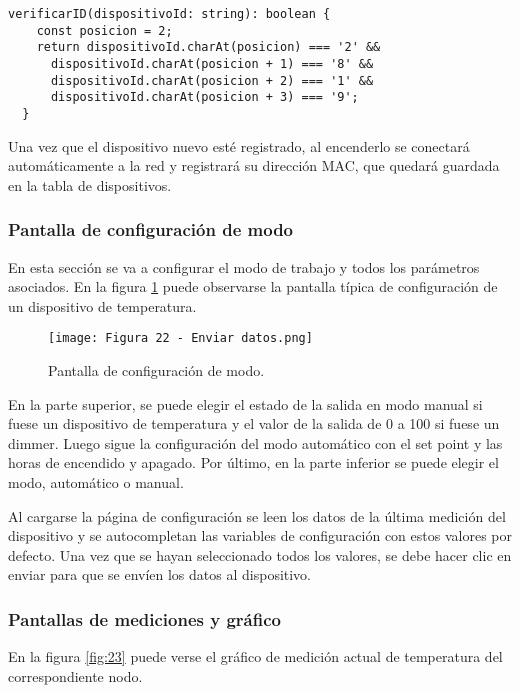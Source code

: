 \begin{lstlisting}[caption={Verificación de ID.}, label={lst:Verificación de ID}]
verificarID(dispositivoId: string): boolean {
    const posicion = 2;
    return dispositivoId.charAt(posicion) === '2' &&
      dispositivoId.charAt(posicion + 1) === '8' &&
      dispositivoId.charAt(posicion + 2) === '1' &&
      dispositivoId.charAt(posicion + 3) === '9';
  }
\end{lstlisting}

Una vez que el dispositivo nuevo esté registrado, al encenderlo se conectará automáticamente a la red y registrará su dirección MAC, que quedará guardada en la tabla de dispositivos.

\subsubsection{Pantalla de configuración de modo}

En esta sección se va a configurar el modo de trabajo y todos los parámetros asociados. En la figura \ref{fig:22} puede observarse la pantalla típica de configuración de un dispositivo de temperatura.

\begin{figure}[h]
\centering
\texttt{[image: Figura 22 - Enviar datos.png]}
\caption[Pantalla de configuración de modo]{Pantalla de configuración de modo.}
\label{fig:22}
\end{figure}

En la parte superior, se puede elegir el estado de la salida en modo manual si fuese un dispositivo de temperatura y el valor de la salida de 0 a 100 si fuese un dimmer. Luego sigue la configuración del modo automático con el set point y las horas de encendido y apagado. Por último, en la parte inferior se puede elegir el modo, automático o manual.

Al cargarse la página de configuración se leen los datos de la última medición del dispositivo y se autocompletan las variables de configuración con estos valores por defecto. Una vez que se hayan seleccionado todos los valores, se debe hacer clic en enviar para que se envíen los datos al dispositivo.

\subsubsection{Pantallas de mediciones y gráfico}

En la figura \ref{fig:23} puede verse el gráfico de medición actual de temperatura del correspondiente nodo.

